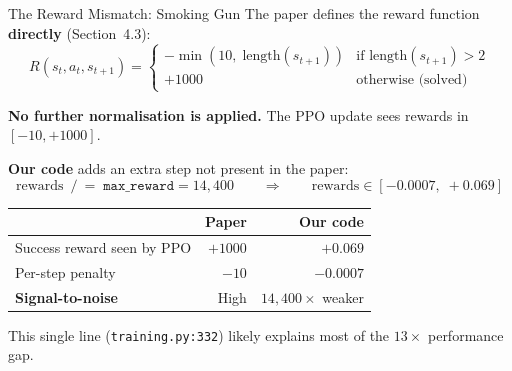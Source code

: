 \documentclass[aspectratio=169,11pt]{beamer}
\begin{document}
\begin{frame}{The Reward Mismatch: Smoking Gun}
  The paper defines the reward function \textbf{directly} (Section~4.3):
  \[
    R(s_t, a_t, s_{t+1}) = \begin{cases}
      -\min(10,\; \mathrm{length}(s_{t+1})) & \text{if } \mathrm{length}(s_{t+1}) > 2 \\
      +1000 & \text{otherwise (solved)}
    \end{cases}
  \]

  \textbf{No further normalisation is applied.}  The PPO update sees rewards in $[-10, +1000]$.

  \bigskip
  \textbf{Our code} adds an extra step \alert{not present in the paper}:
  \[
    \text{rewards} \;\mathrel{/}= \;\texttt{max\_reward} = 14{,}400
    \qquad\Longrightarrow\qquad
    \text{rewards} \in [-0.0007,\; +0.069]
  \]

  \begin{center}
    \begin{tabular}{lrr}
      \toprule
      & \textbf{Paper} & \textbf{Our code} \\
      \midrule
      Success reward seen by PPO & $+1000$ & $+0.069$ \\
      Per-step penalty           & $-10$   & $-0.0007$ \\
      \textbf{Signal-to-noise}   & \textcolor{good}{High} & \textcolor{bad}{$14{,}400\times$ weaker} \\
      \bottomrule
    \end{tabular}
  \end{center}

  \smallskip
  This single line (\texttt{training.py:332}) likely explains most of the $13\times$ performance gap.
\end{frame}
\end{document}
